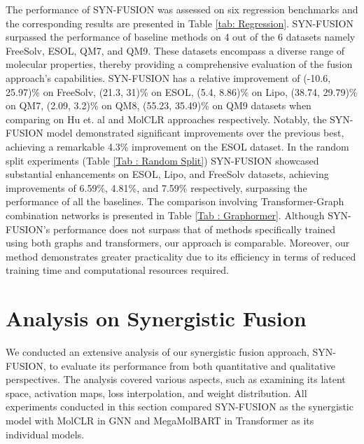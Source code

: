 \documentclass[sigconf,nonacm]{acmart}
\begin{document}
The performance of SYN-FUSION was assessed on six regression benchmarks and the corresponding results are presented in Table \ref{tab: Regression}. SYN-FUSION  surpassed the performance of baseline methods on 4 out of the 6 datasets namely FreeSolv, ESOL, QM7, and QM9. 
These datasets encompass a diverse range of molecular properties, thereby providing a comprehensive evaluation of the fusion approach's capabilities.
SYN-FUSION has a relative improvement of (-10.6, 25.97)\% on FreeSolv, (21.3, 31)\% on ESOL, (5.4, 8.86)\% on Lipo, (38.74, 29.79)\% on QM7,  (2.09, 3.2)\% on QM8, (55.23, 35.49)\% on QM9 datasets when comparing on Hu et. al \cite{DBLP:conf/iclr/HuLGZLPL20} and MolCLR \cite{Wang_2022} approaches respectively. 
Notably, the SYN-FUSION model demonstrated significant improvements over the previous best, achieving a remarkable 4.3\% improvement on the ESOL dataset. 
In the random split experiments (Table \ref{Tab : Random Split}) SYN-FUSION showcased substantial enhancements on ESOL, Lipo, and FreeSolv datasets, achieving improvements of 6.59\%, 4.81\%, and 7.59\% respectively, surpassing the performance of all the baselines. The comparison involving Transformer-Graph combination networks is presented in Table \ref{Tab : Graphormer}. Although SYN-FUSION's performance does not surpass that of methods specifically trained using both graphs and transformers, our approach is comparable. Moreover, our method demonstrates greater practicality due to its efficiency in terms of reduced training time and computational resources required.




























\section{Analysis on Synergistic Fusion}
We conducted an extensive analysis of our synergistic fusion approach, SYN-FUSION, to evaluate its performance from both quantitative and qualitative perspectives. The analysis covered various aspects, such as examining its latent space, activation maps, loss interpolation, and weight distribution. All experiments conducted in this section compared SYN-FUSION as the synergistic model with MolCLR in GNN and MegaMolBART in Transformer as its individual models.
\end{document}

